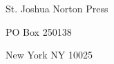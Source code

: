 \documentclass[12pt]{article}
\begin{document}
\newpage

\thispagestyle{empty}
\vspace*{12cm}
\begin{sideways}
\Large{St. Joshua Norton Press}
\end{sideways}
\begin{sideways}
\Large{PO Box 250138}
\end{sideways}
\begin{sideways}
\Large{New York NY 10025}
\end{sideways}
\end{document}
